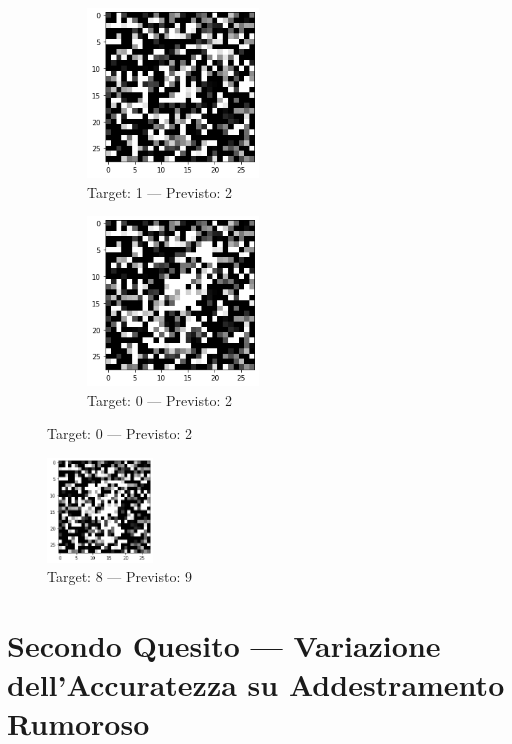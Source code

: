 \documentclass[12pt, a4paper]{article}
\begin{document}
\begin{figure}[H]
    \begin{subfigure}{0.5\textwidth}
        \centering
        \caption{Target: 1 --- Previsto: 2}
        \includegraphics[width=0.5\textwidth]{ErrConv3.png}
    \end{subfigure}
    \begin{subfigure}{0.5\textwidth}
        \centering
        \caption{Target: 0 --- Previsto: 2}
        \includegraphics[width=0.5\textwidth]{ErrConv4.png}
    \end{subfigure}
\end{figure}

\begin{figure}[H]
    \centering
    \caption{Target: 8 --- Previsto: 9}
    \includegraphics[width=0.25\textwidth]{ErrConv5.png}
\end{figure}

\newpage
\section{Secondo Quesito --- Variazione dell'Accuratezza su Addestramento Rumoroso}
\end{document}
